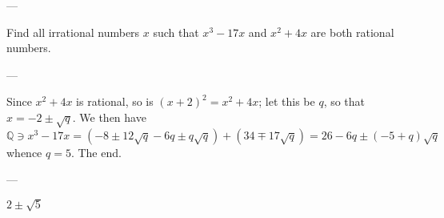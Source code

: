 
---

Find all irrational numbers $x$ such that $x^3-17x$ and $x^2+4x$ are both rational numbers.

---

Since $x^2+4x$ is rational, so is $(x+2)^2=x^2+4x$; let this be $q$, so that $x=-2\pm\sqrt q$. We then have \[\mathbb Q\ni x^3-17x=\left(-8\pm12\sqrt q-6q\pm q\sqrt q\right)+\left(34\mp17\sqrt q\right)=26-6q\pm(-5+q)\sqrt q\]
whence $q=5$. The end.

---

$2\pm\sqrt5$
